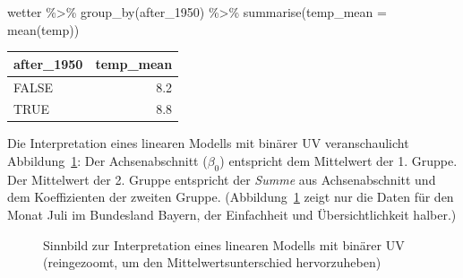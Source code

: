 \documentclass[
  letterpaper,
  oneside,
  open=any]{scrbook}
\newenvironment{Shaded}{\begin{snugshade}}{\end{snugshade}}
\newcommand{\AttributeTok}[1]{\textcolor[rgb]{0.40,0.45,0.13}{#1}}
\newcommand{\FunctionTok}[1]{\textcolor[rgb]{0.28,0.35,0.67}{#1}}
\newcommand{\NormalTok}[1]{\textcolor[rgb]{0.00,0.23,0.31}{#1}}
\newcommand{\SpecialCharTok}[1]{\textcolor[rgb]{0.37,0.37,0.37}{#1}}
\theoremstyle{definition}
\theoremstyle{definition}
\theoremstyle{definition}
\theoremstyle{remark}
\begin{document}
\begin{Shaded}
\begin{Highlighting}[]
\NormalTok{wetter }\SpecialCharTok{\%\textgreater{}\%} 
  \FunctionTok{group\_by}\NormalTok{(after\_1950) }\SpecialCharTok{\%\textgreater{}\%} 
  \FunctionTok{summarise}\NormalTok{(}\AttributeTok{temp\_mean =} \FunctionTok{mean}\NormalTok{(temp))}
\end{Highlighting}
\end{Shaded}

\begin{longtable}[]{@{}lr@{}}
\toprule\noalign{}
after\_1950 & temp\_mean \\
\midrule\noalign{}
\endhead
\bottomrule\noalign{}
\endlastfoot
FALSE & 8.2 \\
TRUE & 8.8 \\
\end{longtable}

Die Interpretation eines linearen Modells mit binärer UV veranschaulicht
Abbildung~\ref{fig-binvar}: Der Achsenabschnitt (\(\beta_0\)) entspricht
dem Mittelwert der 1. Gruppe. Der Mittelwert der 2. Gruppe entspricht
der \emph{Summe} aus Achsenabschnitt und dem Koeffizienten der zweiten
Gruppe. (Abbildung~\ref{fig-binvar} zeigt nur die Daten für den Monat
Juli im Bundesland Bayern, der Einfachheit und Übersichtlichkeit
halber.)

\begin{figure}


\caption{\label{fig-binvar}Sinnbild zur Interpretation eines linearen
Modells mit binärer UV (reingezoomt, um den Mittelwertsunterschied
hervorzuheben)}

\end{figure}%
\end{document}
